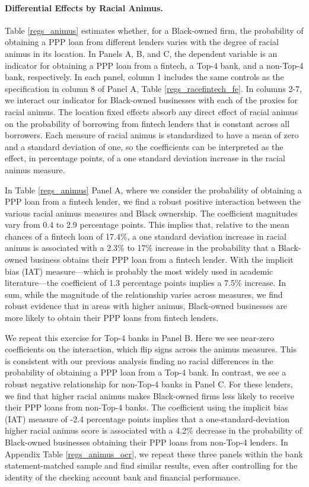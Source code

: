 \documentclass[11pt]{article}
\begin{document}
\paragraph*{Differential Effects by Racial Animus.}

Table \ref{regs_animus} estimates 
whether, for a Black-owned firm, the probability of obtaining a PPP loan from different lenders varies with the degree of racial animus in its location. In Panels A, B, and C, the dependent variable is an indicator for obtaining a PPP loan from a fintech, a Top-4 bank, and a non-Top-4 bank, respectively. In each panel, column 1 includes the same controls as the specification in column 8 of Panel A, Table \ref{regs_racefintech_fe}.  In columns 2-7, we interact our indicator for Black-owned businesses with each of the proxies for racial animus. The location fixed effects absorb any direct effect of racial animus on the probability of borrowing from fintech lenders that is constant across all borrowers. Each measure of racial animus  is standardized to have a mean of zero and a standard deviation of one, so the coefficients can be interpreted as the effect, in percentage points, of a one standard deviation increase in the racial animus measure.

In Table \ref{regs_animus} Panel A, where we consider the probability of obtaining a PPP loan from a fintech lender, we find a robust positive interaction between the various racial animus measures and Black ownership. The coefficient magnitudes vary from 0.4 to 2.9 percentage points. This implies that, relative to the mean chances of a fintech loan of 17.4\%, a one standard deviation increase in racial animus is associated with a 2.3\% to 17\% increase in the probability that a Black-owned business obtains their PPP loan from a fintech lender. With the implicit bias (IAT) measure---which is probably the most widely used in academic literature---the coefficient of 1.3 percentage points implies a 7.5\% increase. In sum, while the magnitude of the relationship varies across measures, we find robust evidence that in areas with higher animus, Black-owned businesses are more likely to obtain their PPP loans from fintech lenders. 

We repeat this exercise for Top-4 banks in Panel B. Here we see near-zero coefficients on the interaction, which flip signs across the animus measures. This is consistent with our previous analysis finding no racial differences in the probability of obtaining a PPP loan from a Top-4 bank. In contrast, we see a robust negative relationship for non-Top-4 banks in Panel C. For these lenders, we find that higher racial animus makes Black-owned firms less likely to receive their PPP loans from non-Top-4 banks. The coefficient using the implicit bias (IAT) measure of -2.4 percentage points implies that a one-standard-deviation higher racial animus score is associated with a 4.2\% decrease in the probability of Black-owned businesses obtaining their PPP loans from non-Top-4 lenders. In Appendix Table \ref{regs_animus_ocr}, we repeat these three panels within the bank statement-matched sample and find similar results, even after controlling for the identity of the checking account bank and financial performance.
\end{document}
